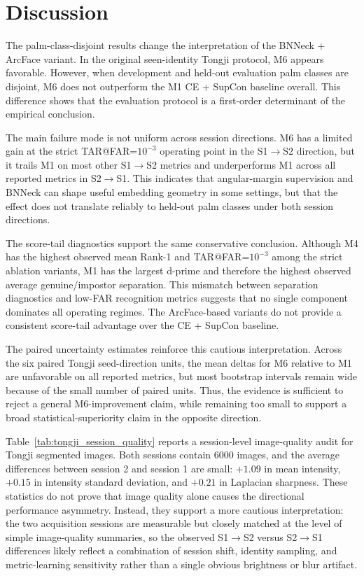 \section{Discussion}

The palm-class-disjoint results change the interpretation of the BNNeck + ArcFace variant. In the original seen-identity Tongji protocol, M6 appears favorable. However, when development and held-out evaluation palm classes are disjoint, M6 does not outperform the M1 CE + SupCon baseline overall. This difference shows that the evaluation protocol is a first-order determinant of the empirical conclusion.

The main failure mode is not uniform across session directions. M6 has a limited gain at the strict TAR@FAR=$10^{-3}$ operating point in the S1$\rightarrow$S2 direction, but it trails M1 on most other S1$\rightarrow$S2 metrics and underperforms M1 across all reported metrics in S2$\rightarrow$S1. This indicates that angular-margin supervision and BNNeck can shape useful embedding geometry in some settings, but that the effect does not translate reliably to held-out palm classes under both session directions.

The score-tail diagnostics support the same conservative conclusion. Although M4 has the highest observed mean Rank-1 and TAR@FAR=$10^{-3}$ among the strict ablation variants, M1 has the largest d-prime and therefore the highest observed average genuine/impostor separation. This mismatch between separation diagnostics and low-FAR recognition metrics suggests that no single component dominates all operating regimes. The ArcFace-based variants do not provide a consistent score-tail advantage over the CE + SupCon baseline.

The paired uncertainty estimates reinforce this cautious interpretation. Across the six paired Tongji seed-direction units, the mean deltas for M6 relative to M1 are unfavorable on all reported metrics, but most bootstrap intervals remain wide because of the small number of paired units. Thus, the evidence is sufficient to reject a general M6-improvement claim, while remaining too small to support a broad statistical-superiority claim in the opposite direction.



Table~\ref{tab:tongji_session_quality} reports a session-level image-quality audit for Tongji segmented images. Both sessions contain 6000 images, and the average differences between session 2 and session 1 are small: $+1.09$ in mean intensity, $+0.15$ in intensity standard deviation, and $+0.21$ in Laplacian sharpness. These statistics do not prove that image quality alone causes the directional performance asymmetry. Instead, they support a more cautious interpretation: the two acquisition sessions are measurable but closely matched at the level of simple image-quality summaries, so the observed S1$\rightarrow$S2 versus S2$\rightarrow$S1 differences likely reflect a combination of session shift, identity sampling, and metric-learning sensitivity rather than a single obvious brightness or blur artifact.

